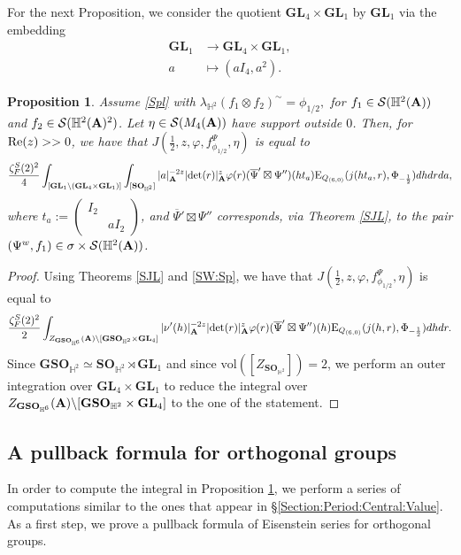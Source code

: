 \documentclass[11pt, reqno]{amsart}
\theoremstyle{plain}
\newtheorem{proposition}[theorem]{Proposition}
\theoremstyle{definition}
\theoremstyle{remark}
\theoremstyle{plain}
\def\A{{\bf A}}
\def\det{\mathrm{det}}
\def\GSO{{\mathbf{GSO}}}
\def\GL{\mathbf{GL}}
\begin{document}
For the next Proposition, we consider the quotient $\GL_4\times \GL_1$ by $\GL_1$ via the embedding 
\begin{align}
    \label{Embedding:GL1}\GL_1&\to \GL_4\times \GL_1,\\
    a&\mapsto (aI_4,a^2).\nonumber
\end{align}
\begin{proposition}\label{Final:Proposition:SeeSaw}
   Assume \eqref{Spl} with $ \lambda_{\mathbb{H}^2}(f_1 \otimes f_2)^{\sim} = \phi_{1/2},$ for $ f_1\in \mathcal{S}(\mathbb{H}^2(\A))$ and $f_2 \in \mathcal{S}(\mathbb{H}^2(\A)^2)$. Let $\eta \in \mathcal{S}(M_4(\A))$ have support outside $0$. Then, for ${\rm Re}(z)>>0$, we have that $J(\tfrac{1}{2},z,\varphi,f^\Psi_{\phi_{1/2}}, \eta)$ is equal to
\[\frac{\zeta^S_F(2)^2}{4}\int_{[ \GL_1 \backslash (\GL_4 \times \GL_1)]}\int_{[ \mathbf{SO}_{\mathbb{H}^2}]}|a|_\A^{-2z}|\det(r)|^{z}_{\A}\varphi(r)(\overline{\Psi}'\boxtimes\Psi'')(h t_a )\mathrm{E}_{Q_{(6,0)}}(j(h t_a ,r),\Phi_{-\frac{1}{2}})dhdrda,\]
where $t_a := \left(\begin{smallmatrix}I_2& \\ &aI_2\end{smallmatrix}\right)$, and $\overline{\Psi}'\boxtimes\Psi''$ corresponds, via Theorem \ref{SJL}, to the pair $(\Psi^{w},f_1)\in \sigma\times\mathcal{S}(\mathbb{H}^2(\A))$. 
\end{proposition}
\begin{proof}
Using Theorems \ref{SJL} and \ref{SW:Sp}, we have that $J(\tfrac{1}{2},z,\varphi,f^\Psi_{\phi_{1/2}}, \eta)$ is equal to
\[\frac{\zeta^S_F(2)^2}{2} \int_{Z_{\GSO_{\mathbb{H}^6}}(\A)\backslash[\mathbf{GSO}_{\mathbb{H}^2}\times \GL_4]}|\nu'(h)|_\A^{-2z}|\det(r)|^{z}_{\A}\varphi(r)(\overline{\Psi}'\boxtimes\Psi'')(h)\mathrm{E}_{Q_{(6,0)}}(j(h,r),\Phi_{-\frac{1}{2}})dhdr.\]
Since $\GSO_{\mathbb{H}^2}\simeq \mathbf{SO}_{\mathbb{H}^2}\rtimes \GL_1$ and since $\mathrm{vol}([Z_{\mathbf{SO}_{\mathbb{H}^2}}]) = 2$, we perform an outer integration over $\GL_4 \times \GL_1$ to reduce the integral over $Z_{\GSO_{\mathbb{H}^6}}(\A)\backslash[\mathbf{GSO}_{\mathbb{H}^2}\times \GL_4]$ to the one of the statement. 
\end{proof}


\subsection{A pullback formula for orthogonal groups}\label{subsec:Pullback:Orthogonal}

In order to compute the integral in Proposition \ref{Final:Proposition:SeeSaw}, we perform a series of computations similar to the ones that appear in \S \ref{Section:Period:Central:Value}. As a first step, we prove a pullback formula of Eisenstein series for orthogonal groups.
\end{document}
